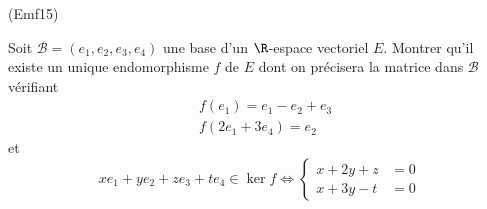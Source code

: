 \begin{tiny}(Emf15)\end{tiny} Soit $\mathcal{B}=(e_1,e_2,e_3,e_4)$ une base d'un $\R$-espace vectoriel $E$. Montrer qu'il existe un unique endomorphisme $f$ de $E$ dont on précisera la matrice dans $\mathcal{B}$ vérifiant
\begin{align*}
 &f(e_1) = e_1-e_2 +e_3\\
&f(2e_1+3e_4) =e_2
\end{align*}
 et
\begin{displaymath}
 xe_1+ye_2+ze_3+te_4\in \ker f 
\Leftrightarrow
\left\lbrace 
\begin{aligned}
 x+2y+z &=0 \\ x+3y-t &= 0
\end{aligned}
\right. 
\end{displaymath}
